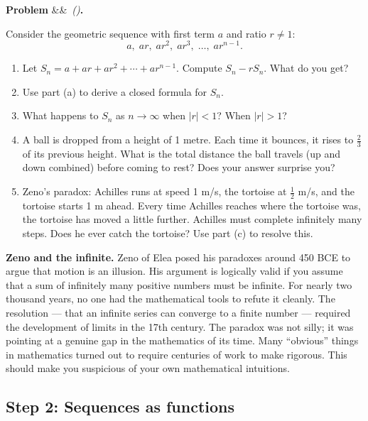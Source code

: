 \documentclass[12pt, a4paper]{article}
\newcounter{problem}
\newenvironment{problem}[1][]{%
  \refstepcounter{problem}%
  \par\vspace{6pt}%
  \noindent\textbf{\color{MidBlue}Problem \theproblem}%
  \ifx&#1&\else\ \textit{(#1)}\fi\textbf{.}\enskip
}{\par\vspace{4pt}}
\begin{document}
\begin{problem}
\label{prob:geometric_sum}
Consider the geometric sequence with first term $a$ and ratio $r \neq 1$:
\[
a,\; ar,\; ar^2,\; ar^3,\; \ldots,\; ar^{n-1}.
\]
\begin{enumerate}[label=(\alph*), topsep=2pt]
  \item Let $S_n = a + ar + ar^2 + \cdots + ar^{n-1}$. Compute $S_n - rS_n$. What do you get?
  \item Use part (a) to derive a closed formula for $S_n$.
  \item What happens to $S_n$ as $n \to \infty$ when $|r| < 1$? When $|r| > 1$?
  \item A ball is dropped from a height of 1 metre. Each time it bounces, it rises to $\tfrac{2}{3}$ of its previous height. What is the total distance the ball travels (up and down combined) before coming to rest? Does your answer surprise you?
  \item Zeno's paradox: Achilles runs at speed 1 m/s, the tortoise at $\tfrac{1}{2}$ m/s, and the tortoise starts 1 m ahead. Every time Achilles reaches where the tortoise was, the tortoise has moved a little further. Achilles must complete infinitely many steps. Does he ever catch the tortoise? Use part (c) to resolve this.
\end{enumerate}
\end{problem}

\begin{thought}
\textbf{Zeno and the infinite.}
Zeno of Elea posed his paradoxes around 450 BCE to argue that motion is an illusion. His argument is logically valid if you assume that a sum of infinitely many positive numbers must be infinite. For nearly two thousand years, no one had the mathematical tools to refute it cleanly. The resolution --- that an infinite series can converge to a finite number --- required the development of limits in the 17th century. The paradox was not silly; it was pointing at a genuine gap in the mathematics of its time. Many ``obvious'' things in mathematics turned out to require centuries of work to make rigorous. This should make you suspicious of your own mathematical intuitions.
\end{thought}

\subsection{Step 2: Sequences as functions}
\end{document}
